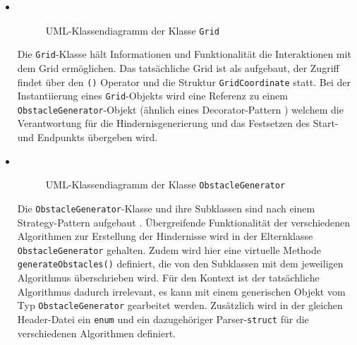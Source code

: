 \begin{itemize}
    \item {} \\
    \begin{figure}[H]
        \vspace{-0.5cm}
        \centering
        
        \caption{UML-Klassendiagramm der Klasse \texttt{Grid}}
        \label{fig:uml_grid}
    \end{figure}
    Die \texttt{Grid}-Klasse hält Informationen und Funktionalität die Interaktionen mit dem Grid ermöglichen.
    Das tatsächliche Grid ist als  aufgebaut, der Zugriff findet über den \texttt{()}
    Operator und die Struktur \texttt{GridCoordinate} statt.
    Bei der Instantiierung eines \texttt{Grid}-Objekts wird eine Referenz zu einem \texttt{ObstacleGenerator}-Objekt (ähnlich eines Decorator-Pattern \cite{nesteruk2021})
    welchem die Verantwortung für die Hindernisgenerierung und das Festsetzen des Start- und Endpunkts übergeben wird.
    \newpage
    \item {} \\
    \begin{figure}[H]
        \vspace{-0.5cm}
        \centering
        
        \caption{UML-Klassendiagramm der Klasse \texttt{ObstacleGenerator}}
        \label{fig:uml_obstacle_gen}
    \end{figure}
    Die \texttt{ObstacleGenerator}-Klasse und ihre Subklassen sind nach einem Strategy-Pattern aufgebaut \cite{nesteruk2021}.
    Übergreifende Funktionalität der verschiedenen Algorithmen zur Erstellung der Hindernisse wird in der Elternklasse \texttt{ObstacleGenerator} gehalten.
    Zudem wird hier eine virtuelle Methode \texttt{generateObstacles()} definiert, die von den Subklassen mit dem jeweiligen Algorithmus überschrieben wird.
    Für den Kontext ist der tatsächliche Algorithmus dadurch irrelevant, es kann mit einem generischen Objekt vom Typ \texttt{ObstacleGenerator} gearbeitet werden.
    Zusätzlich wird in der gleichen Header-Datei ein \texttt{enum} und ein dazugehöriger Parser-\texttt{struct} für die verschiedenen Algorithmen definiert.
\end{itemize}
